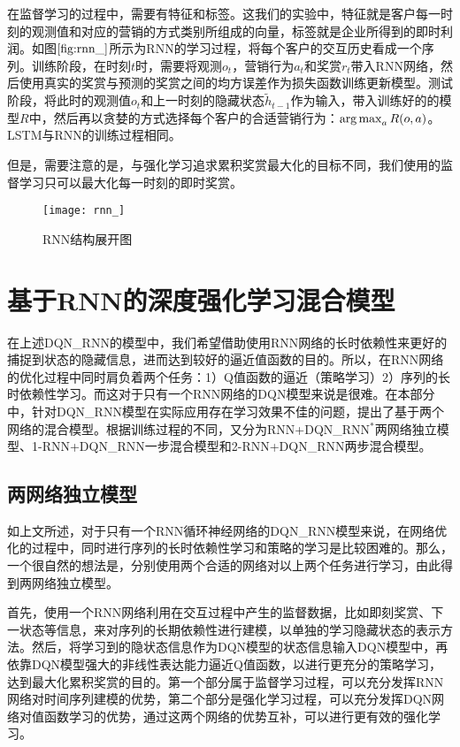 在监督学习的过程中，需要有特征和标签。这我们的实验中，特征就是客户每一时刻的观测值和对应的营销的方式类别所组成的向量，标签就是企业所得到的即时利润。如图$\ref{fig:rnn_}$所示为RNN的学习过程，将每个客户的交互历史看成一个序列。训练阶段，在时刻$t$时，需要将观测$o_{t}$，营销行为$a_{t}$和奖赏$r_{t}$带入RNN网络，然后使用真实的奖赏与预测的奖赏之间的均方误差作为损失函数训练更新模型。测试阶段，将此时的观测值$o_{t}$和上一时刻的隐藏状态$\tilde{h}_{t-1}$作为输入，带入训练好的的模型$R$中，然后再以贪婪的方式选择每个客户的合适营销行为：$\operatorname*{arg\,max}_{a}R(o,a)$。LSTM与RNN的训练过程相同。

 但是，需要注意的是，与强化学习追求累积奖赏最大化的目标不同，我们使用的监督学习只可以最大化每一时刻的即时奖赏。

\begin{figure}[htbp]
\centering
\texttt{[image: rnn\_]}
\caption{RNN结构展开图}
\label{fig:rnn_}
\end{figure}

\section{基于RNN的深度强化学习混合模型}
在上述DQN\_RNN的模型中，我们希望借助使用RNN网络的长时依赖性来更好的捕捉到状态的隐藏信息，进而达到较好的逼近值函数的目的。所以，在RNN网络的优化过程中同时肩负着两个任务：1）Q值函数的逼近（策略学习）2）序列的长时依赖性学习。而这对于只有一个RNN网络的DQN模型来说是很难。在本部分中，针对DQN_RNN模型在实际应用存在学习效果不佳的问题，提出了基于两个网络的混合模型。根据训练过程的不同，又分为RNN+DQN_RNN$^{*}$两网络独立模型、1-RNN+DQN_RNN一步混合模型和2-RNN+DQN_RNN两步混合模型。

\subsection{两网络独立模型}
如上文所述，对于只有一个RNN循环神经网络的DQN\_RNN模型来说，在网络优化的过程中，同时进行序列的长时依赖性学习和策略的学习是比较困难的。那么，一个很自然的想法是，分别使用两个合适的网络对以上两个任务进行学习，由此得到两网络独立模型。

首先，使用一个RNN网络利用在交互过程中产生的监督数据，比如即刻奖赏、下一状态等信息，来对序列的长期依赖性进行建模，以单独的学习隐藏状态的表示方法。然后，将学习到的隐状态信息作为DQN模型的状态信息输入DQN模型中，再依靠DQN模型强大的非线性表达能力逼近Q值函数，以进行更充分的策略学习，达到最大化累积奖赏的目的。第一个部分属于监督学习过程，可以充分发挥RNN网络对时间序列建模的优势，第二个部分是强化学习过程，可以充分发挥DQN网络对值函数学习的优势，通过这两个网络的优势互补，可以进行更有效的强化学习。


